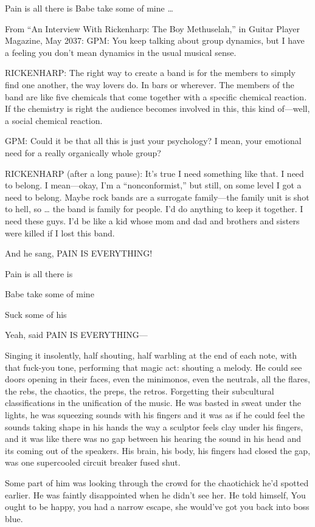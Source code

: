 Pain is all there is Babe take some of mine …

From “An Interview With Rickenharp: The Boy Methuselah,” in Guitar Player Magazine, May 2037: GPM: You keep talking about group dynamics, but I have a feeling you don’t mean dynamics in the usual musical sense.

RICKENHARP: The right way to create a band is for the members to simply find one another, the way lovers do. In bars or wherever. The members of the band are like five chemicals that come together with a specific chemical reaction. If the chemistry is right the audience becomes involved in this, this kind of—well, a social chemical reaction.

GPM: Could it be that all this is just your psychology? I mean, your emotional need for a really organically whole group?

RICKENHARP (after a long pause): It’s true I need something like that. I need to belong. I mean—okay, I’m a “nonconformist,” but still, on some level I got a need to belong. Maybe rock bands are a surrogate family—the family unit is shot to hell, so … the band is family for people. I’d do anything to keep it together. I need these guys. I’d be like a kid whose mom and dad and brothers and sisters were killed if I lost this band.

And he sang, PAIN IS EVERYTHING!

Pain is all there is

Babe take some of mine

Suck some of his

Yeah, said PAIN IS EVERYTHING—

Singing it insolently, half shouting, half warbling at the end of each note, with that fuck-you tone, performing that magic act: shouting a melody. He could see doors opening in their faces, even the minimonos, even the neutrals, all the flares, the rebs, the chaotics, the preps, the retros. Forgetting their subcultural classifications in the unification of the music. He was basted in sweat under the lights, he was squeezing sounds with his fingers and it was as if he could feel the sounds taking shape in his hands the way a sculptor feels clay under his fingers, and it was like there was no gap between his hearing the sound in his head and its coming out of the speakers. His brain, his body, his fingers had closed the gap, was one supercooled circuit breaker fused shut.

Some part of him was looking through the crowd for the chaotichick he’d spotted earlier. He was faintly disappointed when he didn’t see her. He told himself, You ought to be happy, you had a narrow escape, she would’ve got you back into boss blue.

